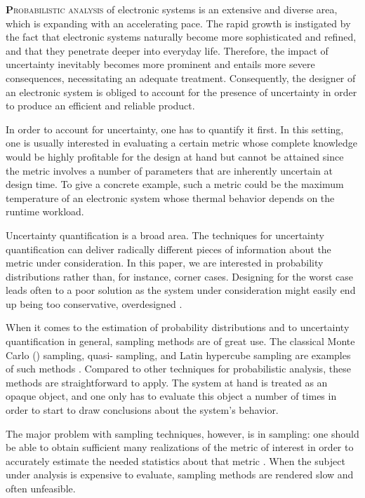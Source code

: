 \lettrine[findent=0.4em, nindent=0em]{\textbf{P}}{robabilistic analysis} of
electronic systems is an extensive and diverse area, which is expanding with an
accelerating pace. The rapid growth is instigated by the fact that electronic
systems naturally become more sophisticated and refined, and that they penetrate
deeper into everyday life. Therefore, the impact of uncertainty inevitably
becomes more prominent and entails more severe consequences, necessitating an
adequate treatment. Consequently, the designer of an electronic system is
obliged to account for the presence of uncertainty in order to produce an
efficient and reliable product.

In order to account for uncertainty, one has to quantify it first. In this
setting, one is usually interested in evaluating a certain metric whose complete
knowledge would be highly profitable for the design at hand but cannot be
attained since the metric involves a number of parameters that are inherently
uncertain at design time. To give a concrete example, such a metric could be the
maximum temperature of an electronic system whose thermal behavior depends on
the runtime workload.

Uncertainty quantification is a broad area. The techniques for uncertainty
quantification can deliver radically different pieces of information about the
metric under consideration. In this paper, we are interested in probability
distributions rather than, for instance, corner cases. Designing for the worst
case leads often to a poor solution as the system under consideration might
easily end up being too conservative, overdesigned \cite{quinton2012}.

When it comes to the estimation of probability distributions and to uncertainty
quantification in general, sampling methods are of great use. The classical
Monte Carlo () sampling, quasi- sampling, and Latin hypercube
sampling are examples of such methods \cite{asmussen2007}. Compared to other
techniques for probabilistic analysis, these methods are straightforward to
apply. The system at hand is treated as an opaque object, and one only has to
evaluate this object a number of times in order to start to draw conclusions
about the system's behavior.

The major problem with sampling techniques, however, is in sampling: one should
be able to obtain sufficient many realizations of the metric of interest in
order to accurately estimate the needed statistics about that metric
\cite{diaz-emparanza2002}. When the subject under analysis is expensive to
evaluate, sampling methods are rendered slow and often unfeasible.

